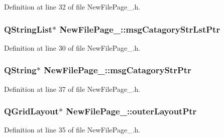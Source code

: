 Definition at line 32 of file New\-File\-Page\-\_.\-h.

\hypertarget{class_new_file_page__3_a77486a3682ab46459e11b679db6fb9b2}{
\subsubsection[{msg\-Catagory\-Str\-Lst\-Ptr}]{\setlength{\rightskip}{0pt plus 5cm}Q\-String\-List$\ast$ New\-File\-Page\-\_\-::msg\-Catagory\-Str\-Lst\-Ptr\hspace{0.3cm}{\ttfamily [private]}}}\label{class_new_file_page__3_a77486a3682ab46459e11b679db6fb9b2}


Definition at line 30 of file New\-File\-Page\-\_.\-h.

\hypertarget{class_new_file_page__3_a96edaebd6c24a640a001464ae9b339d3}{
\subsubsection[{msg\-Catagory\-Str\-Ptr}]{\setlength{\rightskip}{0pt plus 5cm}Q\-String$\ast$ New\-File\-Page\-\_\-::msg\-Catagory\-Str\-Ptr\hspace{0.3cm}{\ttfamily [private]}}}\label{class_new_file_page__3_a96edaebd6c24a640a001464ae9b339d3}


Definition at line 37 of file New\-File\-Page\-\_.\-h.

\hypertarget{class_new_file_page__3_a3cfae6c3a60d34d9e1f481046e5b4a45}{
\subsubsection[{outer\-Layout\-Ptr}]{\setlength{\rightskip}{0pt plus 5cm}Q\-Grid\-Layout$\ast$ New\-File\-Page\-\_\-::outer\-Layout\-Ptr\hspace{0.3cm}{\ttfamily [private]}}}\label{class_new_file_page__3_a3cfae6c3a60d34d9e1f481046e5b4a45}


Definition at line 35 of file New\-File\-Page\-\_.\-h.

